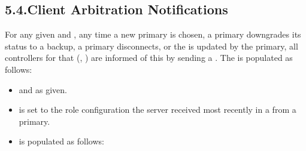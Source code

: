 \documentclass[11pt]{article}
\begin{document}
{%
\subsection{5.4.\hspace*{0.5em}Client Arbitration Notifications}\label{sec-arbitration-notification}%

\noindent{}For any given  and , any time a new primary is chosen, a
primary downgrades its status to a backup, a primary disconnects, or the
 is updated by the primary, all controllers for that
(, ) are informed of this by sending a
. The  is populated as follows:%

\begin{itemize}%

\item{}
 and  as given.%

\item{}
 is set to the role configuration the server received most
recently in a  from a primary.%

\item{}
 is populated as follows:%

\begin{itemize}%


\end{itemize}
\end{itemize}}
\end{document}
